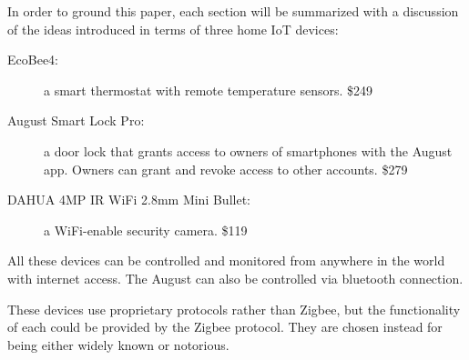 \begin{mdframed}[backgroundcolor=gray!10]
In order to ground this paper, each section will be summarized with a discussion of the ideas introduced in terms of three home IoT devices:
\begin{description}
\item[EcoBee4:] a smart thermostat with remote temperature sensors. \$249
\item[August Smart Lock Pro:] a door lock that grants access to owners of smartphones with the August app. Owners can grant and revoke access to other accounts. \$279
\item[DAHUA 4MP IR WiFi 2.8mm Mini Bullet:] a WiFi-enable security camera. \$119
\end{description}
All these devices can be controlled and monitored from anywhere in the world with internet access. The August can also be controlled via bluetooth connection. 

These devices use proprietary protocols rather than Zigbee, but the functionality of each could be provided by the Zigbee protocol. They are chosen instead for being either widely known or notorious.
\end{mdframed}
